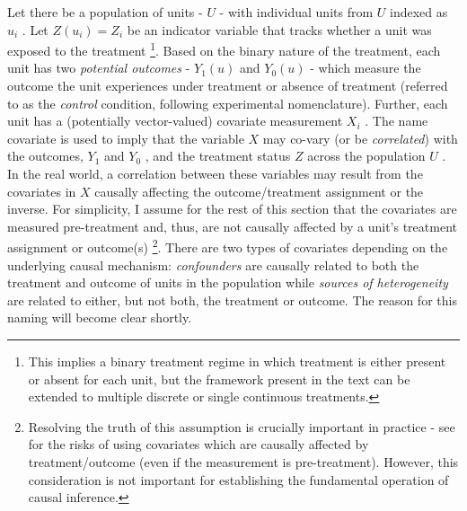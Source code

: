 \documentclass[../main.tex]{subfiles}
\begin{document}
\vspace{\baselineskip}
Let there be a population of units -  \( U \) - with individual units from  \( U \)  indexed as  \( u_{i} \) . Let  \( Z \left( u_{i} \right)  = Z_{i} \) be an indicator variable that tracks whether a unit was exposed to the treatment \footnote{ This implies a binary treatment regime in which treatment is either present or absent for each unit, but the framework present in the text can be extended to multiple discrete or single continuous treatments. }. Based on the binary nature of the treatment, each unit has two \textit{potential outcomes }-  \( Y_{1} \left( u \right)  \) and  \( Y_{0} \left( u \right)  \)  - which measure the outcome the unit experiences under treatment or absence of treatment (referred to as the \textit{control }condition, following experimental nomenclature). Further, each unit has a (potentially vector-valued) covariate measurement  \( X_{i} \) . The name covariate is used to imply that the variable  \( X \) may co-vary (or be \textit{correlated}) with the outcomes,  \( Y_{1} \) and  \( Y_{0} \) , and the treatment status  \( Z \) across the population \( U \) . In the real world, a correlation between these variables may result from the covariates in  \( X \) causally affecting the outcome/treatment assignment or the inverse. For simplicity, I assume for the rest of this section that the covariates are measured pre-treatment and, thus, are not causally affected by a unit’s treatment assignment or outcome(s) \footnote{ Resolving the truth of this assumption is crucially important in practice - see \textcite{Pearl2009CausalOverview} for the risks of using covariates which are causally affected by treatment/outcome (even if the measurement is pre-treatment). However, this consideration is not important for establishing the fundamental operation of causal inference.}. There are two types of covariates depending on the underlying causal mechanism: \textit{confounders} are causally related to both the treatment and outcome of units in the population while \textit{sources of heterogeneity }are related to either, but not both, the treatment or outcome. The reason for this naming will become clear shortly.\par
\end{document}
